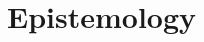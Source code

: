 \documentclass[../introduction.tex]{subfiles}  %
\begin{document}
\section{Epistemology}
\end{document}
